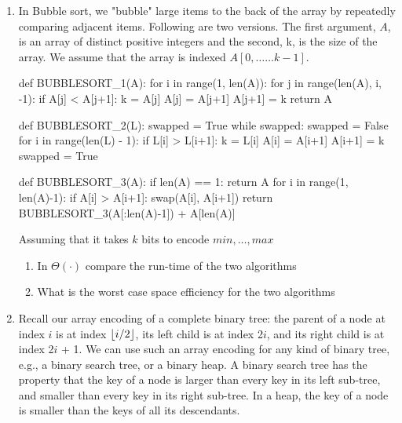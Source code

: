 \documentclass[10pt]{article}
\DeclarePairedDelimiter\floor{\lfloor}{\rfloor}
\begin{document}
\begin{flushleft}
\begin{enumerate}[topsep=-10pt, itemsep=10pt]
    \item In Bubble sort, we "bubble" large items to the back of the array by repeatedly comparing adjacent items.  Following are two versions.  The first argument, $A$,  is an array of distinct positive  integers  and  the  second, k,  is  the  size  of  the  array.   We  assume  that the  array  is indexed $A[0,\dots \dots k-1]$.
    \begin{python}
def BUBBLESORT_1(A):
    for i in range(1, len(A)):
        for j in range(len(A), i, -1):
            if A[j] < A[j+1]:
                k = A[j]
                A[j] = A[j+1]
                A[j+1] = k
    return A
    \end{python}
    \begin{python}
def BUBBLESORT_2(L):
    swapped = True
    while swapped:
        swapped = False
        for i in range(len(L) - 1):
            if L[i] > L[i+1]:
                k = L[i]
                A[i] = A[i+1]
                A[i+1] = k
                swapped = True 
    \end{python}
        \begin{python}
def BUBBLESORT_3(A):
    if len(A) == 1:
        return A
    for i in range(1, len(A)-1):
        if A[i] > A[i+1]:
            swap(A[i], A[i+1])
    return BUBBLESORT_3(A[:len(A)-1]) + A[len(A)]
    \end{python}
    Assuming that it takes $k$ bits to encode $min,\dots,max$
    \begin{enumerate}
        \item In $\Theta(\cdot)$ compare the run-time of the two algorithms
        \item What is the worst case space efficiency for the two algorithms
    \end{enumerate}
    \item  Recall our array encoding of a complete binary tree: the parent of a node at index $i$ is at index $\floor{i/2}$, its left child is at index 2$i$, and its right child is at index 2$i$ + 1. We can use such an array encoding for any kind of binary tree, e.g., a binary search tree, or a binary heap. A binary search tree has the property that the key of a node is larger than every key in its left sub-tree, and smaller than every key in its right sub-tree. In a heap, the key of a node is smaller than the keys of all its descendants.
    \begin{enumerate}

\end{enumerate}
\end{enumerate}
\end{flushleft}
\end{document}
